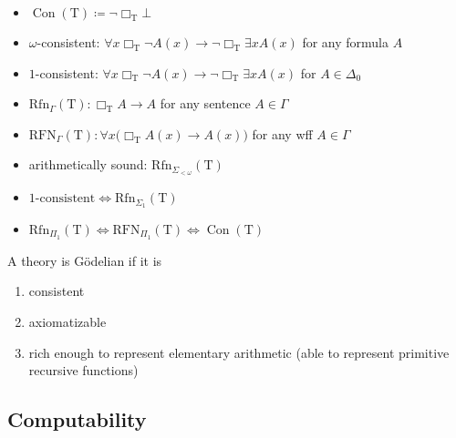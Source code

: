 \documentclass[UTF8,aspectratio=43,11pt,colorlinks,compress,openany]{beamer}%
\begin{document}
\begin{frame}\frametitle{}
	\begin{itemize}
		\item $\operatorname{Con}(\mathrm{T})\coloneqq \neg\Box_{\mathrm{T}}\bot$
		\item $\omega$-consistent: $\forall x\Box_{\mathrm{T}}\neg A(x)\to\neg\Box_{\mathrm{T}}\exists x A(x)$ for any formula $A$
		\item $1$-consistent: $\forall x\Box_{\mathrm{T}}\neg A(x)\to\neg\Box_{\mathrm{T}}\exists x A(x)$ for $A\in\Delta_0$
		\item $\mathrm{Rfn}_\Gamma(\mathrm{T}): \Box_{\mathrm{T}}A\to A$ for any sentence $A\in\Gamma$
		\item $\mathrm{RFN}_\Gamma(\mathrm{T}):\forall x\big(\Box_{\mathrm{T}}A(x)\to A(x)\big)$ for any wff $A\in\Gamma$
		\item arithmetically sound: $\mathrm{Rfn}_{\Sigma_{<\omega}}(\mathrm{T})$
		\item 
		$1\text{-consistent}\iff\mathrm{Rfn}_{\Sigma_1}(\mathrm{T})$
		\item $\mathrm{Rfn}_{\Pi_1}(\mathrm{T})\iff\mathrm{RFN}_{\Pi_1}(\mathrm{T})\iff\operatorname{Con}(\mathrm{T})$
	\end{itemize}
\begin{definition}
	A theory is G\"odelian if it is
	\begin{enumerate}
		\item consistent
		\item axiomatizable
		\item rich enough to represent elementary arithmetic (able to represent primitive recursive functions)
	\end{enumerate}
\end{definition}
\end{frame}

\subsection{Computability}
\end{document}
